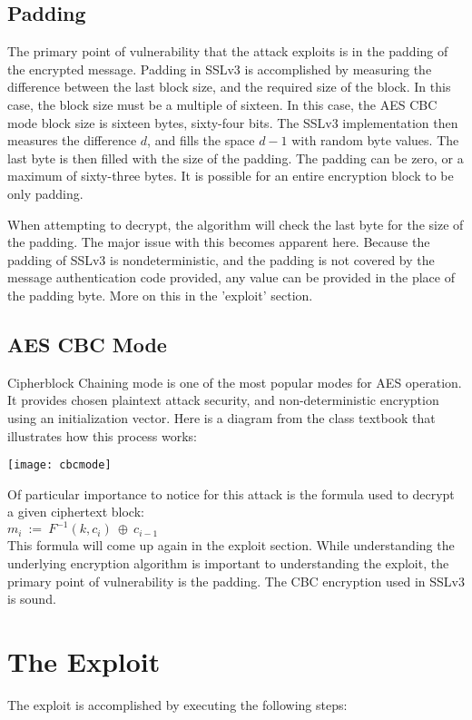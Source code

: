 \documentclass[10pt]{article}
\begin{document}
\subsection*{Padding}
The primary point of vulnerability that the attack exploits is in the padding
of the encrypted message. Padding in SSLv3 is accomplished by measuring the 
difference between the last block size, and the required size of the block. In
this case, the block size must be a multiple of sixteen. In this case, the AES
CBC mode block size is sixteen bytes, sixty-four bits. The SSLv3 implementation
then measures the difference $d$, and fills the space $d-1$ with random byte
values. The last byte is then filled with the size of the padding. The padding
can be zero, or a maximum of sixty-three bytes.\cite{SSLv3} It is possible for
an entire encryption block to be only padding.

When attempting to decrypt, the algorithm will check the last byte for the size of
the padding. The major issue with this becomes apparent here. Because the padding
of SSLv3 is nondeterministic, and the padding is not covered by the message
authentication code provided, any value can be provided in the place of the
padding byte.\cite{POODLE} More on this in the 'exploit' section.

\subsection*{AES CBC Mode}
Cipherblock Chaining mode is one of the most popular modes for AES operation.
It provides chosen plaintext attack security, and non-deterministic encryption
using an initialization vector. Here is a diagram from the class textbook that
illustrates how this process works:\cite{rosulek}

\texttt{[image: cbcmode]}

Of particular importance to notice for this attack is the formula used to decrypt
a given ciphertext block:\\

\noindent $m_i\ :=\ F^{-1}(k,c_i)\ \oplus\ c_{i-1}$\\

This formula will come up again in the exploit section. While understanding the
underlying encryption algorithm is important to understanding the exploit, the
primary point of vulnerability is the padding. The CBC encryption used in SSLv3
is sound. 

\section*{The Exploit}
The exploit is accomplished by executing the following steps:
\end{document}
